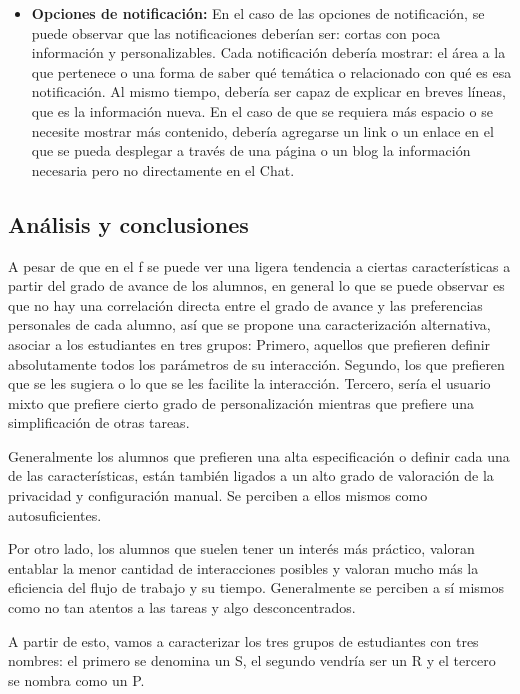 \begin{itemize}
        \item \textbf{Opciones de notificación:} En el caso de las opciones de notificación, se puede observar que las notificaciones deberían ser: cortas con poca información y personalizables. Cada notificación debería mostrar: el área a la que pertenece o una forma de saber qué temática o relacionado con qué es esa notificación. Al mismo tiempo, debería ser capaz de explicar en breves líneas, que es la información nueva. En el caso de que se requiera más espacio o se necesite mostrar más contenido, debería agregarse un link o un enlace en el que se pueda desplegar a través de una página o un blog la información necesaria pero no directamente en el Chat.
        
    \end{itemize}

    \subsection{Análisis y conclusiones}
    \par A pesar de que en el \acrlong{f} se puede ver una ligera tendencia a ciertas características a partir del grado de avance de los alumnos, en general lo que se puede observar es que no hay una correlación directa entre el grado de avance y las preferencias personales de cada alumno, así que se propone una caracterización alternativa, asociar a los estudiantes en tres grupos: Primero, aquellos que prefieren definir absolutamente todos los parámetros de su interacción. Segundo, los que prefieren que se les sugiera o lo que se les facilite la interacción. Tercero, sería el usuario mixto que prefiere cierto grado de personalización mientras que prefiere una simplificación de otras tareas.
    \par Generalmente los alumnos que prefieren una alta especificación o definir cada una de las características, están también ligados a un alto grado de valoración de la privacidad y configuración manual. Se perciben a ellos mismos como autosuficientes.
    \par Por otro lado, los alumnos que suelen tener un interés más práctico, valoran entablar la menor cantidad de interacciones posibles y valoran mucho más la eficiencia del flujo de trabajo y su tiempo. Generalmente se perciben a sí mismos como no tan atentos a las tareas y algo desconcentrados.
    \par A partir de esto, vamos a caracterizar los tres grupos de estudiantes con tres nombres: el primero se denomina un \acrfull{S}, el segundo vendría ser un \acrfull{R} y el tercero se nombra como un \acrfull{P}.
